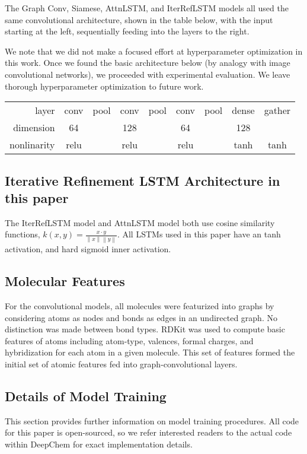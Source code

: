The Graph Conv, Siamese, AttnLSTM, and IterRefLSTM models all used the same convolutional architecture, shown in the table below, with the input starting at the left, sequentially feeding into the layers to the right.

We note that we did not make a focused effort at hyperparameter optimization in this work. Once we found the basic architecture below (by analogy with image convolutional networks), we proceeded with experimental evaluation. We leave thorough hyperparameter optimization to future work.

\begin{table}
    \begin{tabular}{ r | c | c | c | c | c | c | c | c |}
    \cline{2-9}
    layer & conv & pool & conv & pool & conv & pool & dense & gather\\
    dimension & 64 & & 128 & & 64 & & 128 &\\
    nonlinarity & relu & & relu & & relu & & tanh & tanh\\
    \cline{2-9}
    \end{tabular}
    
\end{table}

\subsection{Iterative Refinement LSTM Architecture in this paper}

The IterRefLSTM model and AttnLSTM model both use cosine similarity functions, $k(x,y) = \frac{x\cdot y}{ \left\|x\right\|\left\|y\right\|}$. All LSTMs used in this paper have an tanh activation, and hard sigmoid inner activation.

\subsection{Molecular Features}

For the convolutional models, all molecules were featurized into graphs by considering atoms as nodes and bonds as edges in an undirected graph. No distinction was made between bond types. RDKit \cite{landrum2016} was used to compute basic features of atoms including atom-type, valences, formal charges, and hybridization for each atom in a given molecule. This set  of features formed the initial set of atomic features fed into graph-convolutional layers. 

\subsection{Details of Model Training}
This section provides further information on model training procedures. All code for this paper is open-sourced, so we refer interested readers to the actual code within DeepChem for exact implementation details.
